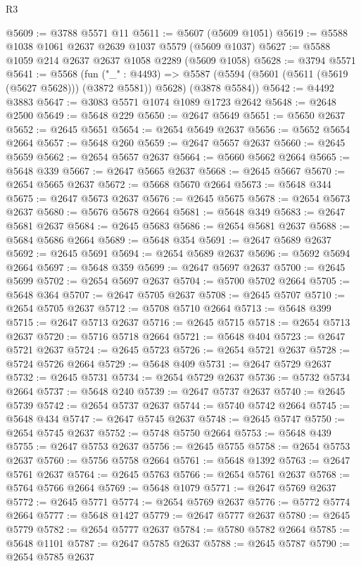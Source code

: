 \begin{lexlean}{R3}
\begin{coremodule}
@5609 := @3788 @5571 @11
@5611 := @5607 (@5609 @1051)
@5619 := @5588 @1038 @1061 @2637 @2639 @1037 @5579 (@5609 @1037)
@5627 := @5588 @1059 @214 @2637 @2637 @1058 @2289 (@5609 @1058)
@5628 := @3794 @5571
@5641 := @5568
    (fun ("_" : @4493) =>
    @5587 (@5594 (@5601 (@5611 (@5619 (@5627 @5628))) (@3872 @5581)) @5628) (@3878 @5584))
@5642 := @4492 @3883
@5647 := @3083 @5571 @1074 @1089 @1723 @2642
@5648 := @2648 @2500
@5649 := @5648 @229
@5650 := @2647 @5649
@5651 := @5650 @2637
@5652 := @2645 @5651
@5654 := @2654 @5649 @2637
@5656 := @5652 @5654 @2664
@5657 := @5648 @260
@5659 := @2647 @5657 @2637
@5660 := @2645 @5659
@5662 := @2654 @5657 @2637
@5664 := @5660 @5662 @2664
@5665 := @5648 @339
@5667 := @2647 @5665 @2637
@5668 := @2645 @5667
@5670 := @2654 @5665 @2637
@5672 := @5668 @5670 @2664
@5673 := @5648 @344
@5675 := @2647 @5673 @2637
@5676 := @2645 @5675
@5678 := @2654 @5673 @2637
@5680 := @5676 @5678 @2664
@5681 := @5648 @349
@5683 := @2647 @5681 @2637
@5684 := @2645 @5683
@5686 := @2654 @5681 @2637
@5688 := @5684 @5686 @2664
@5689 := @5648 @354
@5691 := @2647 @5689 @2637
@5692 := @2645 @5691
@5694 := @2654 @5689 @2637
@5696 := @5692 @5694 @2664
@5697 := @5648 @359
@5699 := @2647 @5697 @2637
@5700 := @2645 @5699
@5702 := @2654 @5697 @2637
@5704 := @5700 @5702 @2664
@5705 := @5648 @364
@5707 := @2647 @5705 @2637
@5708 := @2645 @5707
@5710 := @2654 @5705 @2637
@5712 := @5708 @5710 @2664
@5713 := @5648 @399
@5715 := @2647 @5713 @2637
@5716 := @2645 @5715
@5718 := @2654 @5713 @2637
@5720 := @5716 @5718 @2664
@5721 := @5648 @404
@5723 := @2647 @5721 @2637
@5724 := @2645 @5723
@5726 := @2654 @5721 @2637
@5728 := @5724 @5726 @2664
@5729 := @5648 @409
@5731 := @2647 @5729 @2637
@5732 := @2645 @5731
@5734 := @2654 @5729 @2637
@5736 := @5732 @5734 @2664
@5737 := @5648 @240
@5739 := @2647 @5737 @2637
@5740 := @2645 @5739
@5742 := @2654 @5737 @2637
@5744 := @5740 @5742 @2664
@5745 := @5648 @434
@5747 := @2647 @5745 @2637
@5748 := @2645 @5747
@5750 := @2654 @5745 @2637
@5752 := @5748 @5750 @2664
@5753 := @5648 @439
@5755 := @2647 @5753 @2637
@5756 := @2645 @5755
@5758 := @2654 @5753 @2637
@5760 := @5756 @5758 @2664
@5761 := @5648 @1392
@5763 := @2647 @5761 @2637
@5764 := @2645 @5763
@5766 := @2654 @5761 @2637
@5768 := @5764 @5766 @2664
@5769 := @5648 @1079
@5771 := @2647 @5769 @2637
@5772 := @2645 @5771
@5774 := @2654 @5769 @2637
@5776 := @5772 @5774 @2664
@5777 := @5648 @1427
@5779 := @2647 @5777 @2637
@5780 := @2645 @5779
@5782 := @2654 @5777 @2637
@5784 := @5780 @5782 @2664
@5785 := @5648 @1101
@5787 := @2647 @5785 @2637
@5788 := @2645 @5787
@5790 := @2654 @5785 @2637

\end{coremodule}
\end{lexlean}
